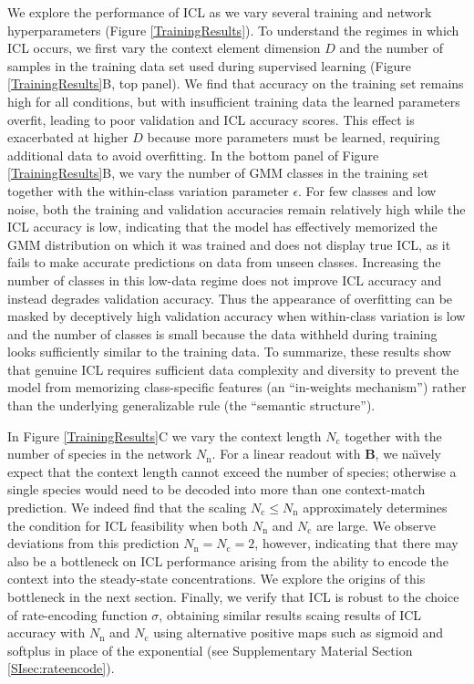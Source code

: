 \documentclass[%
reprint,
superscriptaddress,
amsmath,amssymb,
aps,
]{revtex4-2}
\begin{document}
	We explore the performance of ICL as we vary several training and network hyperparameters (Figure \ref{TrainingResults}).  To understand the regimes in which ICL occurs, we first vary the context element dimension $D$ and the number of samples in the training data set used during supervised learning (Figure \ref{TrainingResults}B, top panel). We find that accuracy on the training set remains high for all conditions, but with insufficient training data the learned parameters overfit, leading to poor validation and ICL accuracy scores. This effect is exacerbated at higher $D$ because more parameters must be learned, requiring additional data to avoid overfitting. In the bottom panel of Figure \ref{TrainingResults}B, we vary the number of GMM classes in the training set together with the within-class variation parameter $\epsilon$. For few classes and low noise, both the training and validation accuracies remain relatively high while the ICL accuracy is low, indicating that the model has effectively memorized the GMM distribution on which it was trained and does not display true ICL, as it fails to make accurate predictions on data from unseen classes. Increasing the number of classes in this low-data regime does not improve ICL accuracy and instead degrades validation accuracy. Thus the appearance of overfitting can be masked by deceptively high validation accuracy when within-class variation is low and the number of classes is small because the data withheld during training looks sufficiently similar to the training data. To summarize, these results show that genuine ICL requires sufficient data complexity and diversity to prevent the model from memorizing class-specific features (an ``in-weights mechanism'') rather than the underlying generalizable rule (the ``semantic structure'').
	
	In Figure \ref{TrainingResults}C we vary the context length $N_\text{c}$ together with the number of species in the network $N_\text{n}$. For a linear readout with $\mathbf{B}$, we na\"{\i}vely expect that the context length cannot exceed the number of species; otherwise a single species would need to be decoded into more than one context-match prediction. We indeed find that the scaling $N_\text{c} \leq N_\text{n}$ approximately determines the condition for ICL feasibility when both $N_\text{n}$ and $N_\text{c}$ are large. We observe deviations from this prediction $N_\text{n} = N_\text{c} = 2$, however, indicating that there may also be a bottleneck on ICL performance arising from the ability to encode the context into the steady-state concentrations. We explore the origins of this bottleneck in the next section.  Finally, we verify that ICL is robust to the choice of rate-encoding function $\sigma$, obtaining similar results scaing results of ICL accuracy with $N_\text{n}$ and $N_\text{c}$ using alternative positive maps such as sigmoid and softplus in place of the exponential (see Supplementary Material Section \ref{SIsec:rateencode}).
	
\end{document}
